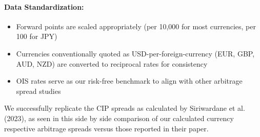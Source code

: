 \documentclass{article}
\begin{document}
\begin{appendices}
\paragraph{Data Standardization:}
\begin{itemize}
    \item Forward points are scaled appropriately (per 10,000 for most currencies, per 100 for JPY)
    \item Currencies conventionally quoted as USD-per-foreign-currency (EUR, GBP, AUD, NZD) are converted to reciprocal rates for consistency
    \item OIS rates serve as our risk-free benchmark to align with other arbitrage spread studies
\end{itemize}

We successfully replicate the CIP spreads as calculated by Siriwardane et al. (2023),
as seen in this side by side comparison of our calculated currency respective
arbitrage spreads versus those reported in their paper.


\end{appendices}
\end{document}
